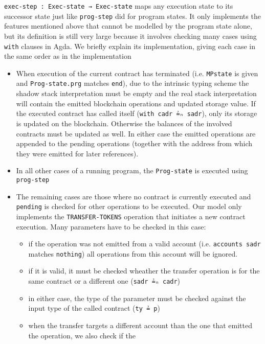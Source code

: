 \verb|exec-step : Exec-state → Exec-state| maps any execution state to its successor state
just like \verb/prog-step/ did for program states.
It only implements the features mentioned above that cannot be modelled by the program state alone,
but its definition is still very large because it involves checking many cases using
\verb/with/ clauses in Agda. 
We briefly explain its implementation, giving each case in the same
order as in the implementation

\begin{itemize}
	\item	When execution of the current contract has terminated
		(i.e. \verb/MPstate/ is given and \verb=Prog-state.prg= matches \verb=end=),
		due to the intrinsic typing scheme the shadow stack interpretation must be empty
		and the real stack interpretation will contain the emitted blockchain operations
		and updated storage value.
		If the executed contract has called itself (\verb/with cadr ≟ₙ sadr/),
		only its storage is updated on the blockchain.
		Otherwise the balances of the involved contracts must be updated as well.
		In either case the emitted operations are appended to the pending operations
		(together with the address from which they were emitted for later references).
	\item	In all other cases of a running program, the \verb=Prog-state= is executed
		using \verb=prog-step=
	\item	The remaining cases are those where no contract is currently executed
		and \verb=pending= is checked for other operations to be executed.
		Our model only implements the \verb/TRANSFER-TOKENS/ operation
		that initiates a new contract execution.
		Many parameters have to be checked in this case:
		\begin{itemize}
			\item	if the operation was not emitted from a valid account
				(i.e. \verb/accounts sadr/ matches \verb/nothing/)
				all operations from this account will be ignored.
			\item	if it is valid, it must be checked wheather the transfer
				operation is for the same contract or a different one
				(\verb/sadr ≟ₙ cadr/)
			\item	in either case, the type of the parameter must be checked
				against the input type of the called contract
				(\verb/ty ≟ p/)
			\item	when the transfer targets a different account than the one
				that emitted the operation, we also check if the

\end{itemize}
\end{itemize}
